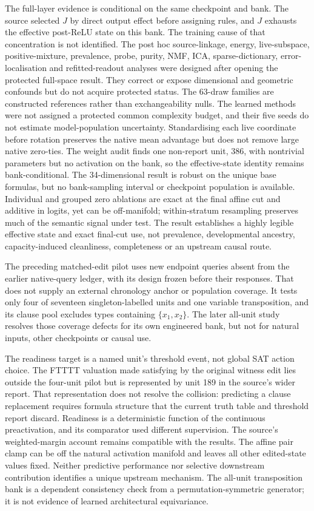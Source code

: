 \documentclass[
  british,
  11pt,
  a4paper,
]{article}
\begin{document}
The full-layer evidence is conditional on the same checkpoint and bank.
The source selected \(J\) by direct output effect before assigning
rules, and \(J\) exhausts the effective post-ReLU state on this bank.
The training cause of that concentration is not identified. The post hoc
source-linkage, energy, live-subspace, positive-mixture, prevalence,
probe, purity, NMF, ICA, sparse-dictionary, error-localisation and
refitted-readout analyses were designed after opening the protected
full-space result. They correct or expose dimensional and geometric
confounds but do not acquire protected status. The 63-draw families are
constructed references rather than exchangeability nulls. The learned
methods were not assigned a protected common complexity budget, and
their five seeds do not estimate model-population uncertainty.
Standardising each live coordinate before rotation preserves the native
mean advantage but does not remove large native zero-ties. The weight
audit finds one non-report unit, 386, with nontrivial parameters but no
activation on the bank, so the effective-state identity remains
bank-conditional. The 34-dimensional result is robust on the unique base
formulas, but no bank-sampling interval or checkpoint population is
available. Individual and grouped zero ablations are exact at the final
affine cut and additive in logits, yet can be off-manifold;
within-stratum resampling preserves much of the semantic signal under
test. The result establishes a highly legible effective state and exact
final-cut use, not prevalence, developmental ancestry, capacity-induced
cleanliness, completeness or an upstream causal route.

The preceding matched-edit pilot uses new endpoint queries absent from
the earlier native-query ledger, with its design frozen before their
responses. That does not supply an external chronology anchor or
population coverage. It tests only four of seventeen singleton-labelled
units and one variable transposition, and its clause pool excludes types
containing \(\{x_1,x_2\}\). The later all-unit study resolves those
coverage defects for its own engineered bank, but not for natural
inputs, other checkpoints or causal use.

The readiness target is a named unit's threshold event, not global SAT
action choice. The FTTTT valuation made satisfying by the original
witness edit lies outside the four-unit pilot but is represented by unit
189 in the source's wider report. That representation does not resolve
the collision: predicting a clause replacement requires formula
structure that the current truth table and threshold report discard.
Readiness is a deterministic function of the continuous preactivation,
and its comparator used different supervision. The source's
weighted-margin account remains compatible with the results. The affine
pair clamp can be off the natural activation manifold and leaves all
other edited-state values fixed. Neither predictive performance nor
selective downstream contribution identifies a unique upstream
mechanism. The all-unit transposition bank is a dependent consistency
check from a permutation-symmetric generator; it is not evidence of
learned architectural equivariance.
\end{document}
